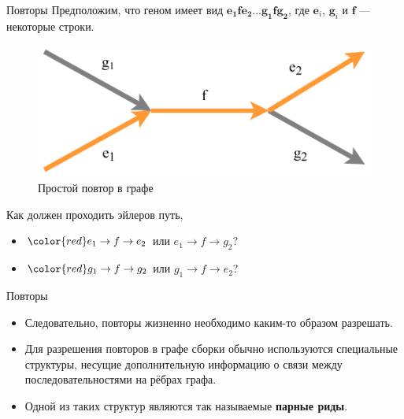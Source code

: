 \documentclass[unicode, notheorems]{beamer}
\begin{document}
\begin{frame}{Повторы}
	Предположим, что геном имеет вид $\mathbf{e_1 f e_2 \ldots g_1 f g_2}$, где $\mathbf{e}_i$, $\mathbf{g}_i$ и $\mathbf{f}$ --- некоторые строки.

	\begin{figure}
		\centering
		\includegraphics[scale=0.5]{img/repeat}
		\caption{Простой повтор в графе}
	\end{figure}

	Как должен проходить эйлеров путь,
	\begin{itemize}
		\item $\color{red} e_1 \to f \to e_2$ или $e_1 \to f \to g_2$?
		\item $\color{red} g_1 \to f \to g_2$ или $g_1 \to f \to e_2$?
	\end{itemize}
\end{frame}

\begin{frame}{Повторы}
	\begin{itemize}
		\item Следовательно, повторы жизненно необходимо каким-то образом разрешать.
		\item Для разрешения повторов в графе сборки обычно используются специальные структуры, несущие дополнительную информацию о связи между последовательностями на рёбрах графа.
		\item Одной из таких структур являются так называемые \textbf{парные риды}.
	\end{itemize}
\end{frame}
\end{document}
